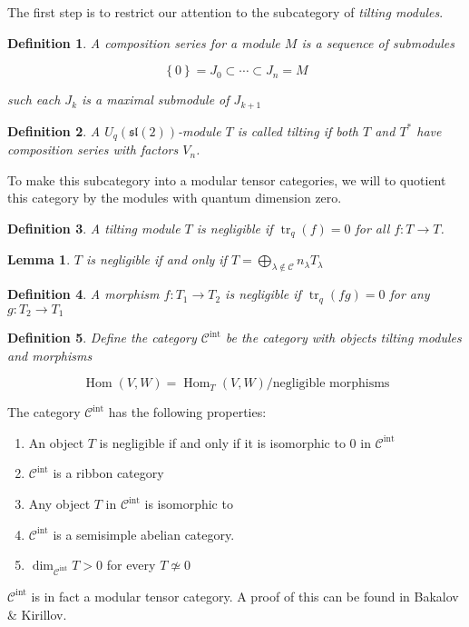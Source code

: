\documentclass[]{article}
\newtheorem{defn}{Definition}
\newtheorem{lemma}{Lemma}
\newcommand{\tr}{\operatorname{tr}}
\newcommand{\Hom}{\operatorname{Hom}}
\begin{document}
The first step is to restrict our attention to the subcategory of \emph{tilting modules}. 

\begin{defn}
    A \emph{composition series} for a module $M$ is a sequence of submodules 

    \begin{equation}
        \left\{ 0 \right\} = J_0 \subset \cdots \subset J_n = M
    \end{equation}

    such each $J_k$ is a maximal submodule of $J_{k+1}$
\end{defn}
\begin{defn}
    A $U_q(\mathfrak{sl}(2))$-module $T$ is called \emph{tilting} if both $T$ and $T^*$ have composition series with factors $V_n$.
\end{defn}

To make this subcategory into a modular tensor categories, we will to quotient
this category by the modules with quantum dimension zero. 

\begin{defn}
    A tilting module $T$ is \emph{negligible} if $\tr_q(f) = 0$ for all $f: T \to T$.
\end{defn}
\begin{lemma}
    $T$ is negligible if and only if $T = \bigoplus _{\lambda \notin \mathcal{C}} n_\lambda T_\lambda$
\end{lemma}

\begin{defn}
    A morphism $f: T_1 \to T_2$ is \emph{negligible} if $\tr_q(fg) = 0$ for any $g: T_2 \to T_1$
\end{defn}

\begin{defn}
    Define the category $\mathcal{C}^\text{int}$ be the category with objects tilting modules and morphisms 

    \begin{equation*}
        \Hom(V,W) = \Hom_T(V,W) / \text{negligible morphisms}
    \end{equation*}
\end{defn}

The category $\mathcal{C}^\text{int}$ has the following properties:
\begin{enumerate}
    \item An object $T$ is negligible if and only if it is isomorphic to 0 in $\mathcal{C}^\text{int}$
    \item  $\mathcal{C}^\text{int}$ is a ribbon category
    \item Any object $T$ in $\mathcal{C}^\text{int}$ is isomorphic to %
    \item $\mathcal{C}^\text{int}$ is a semisimple abelian category. 
    \item $\dim_{\mathcal{C}^\text{int}} T > 0$ for every $T \not\simeq 0$
\end{enumerate}

$\mathcal{C}^\text{int}$ is in fact a modular tensor category. A proof of this
can be found in Bakalov \& Kirillov. %
 

\end{document}
